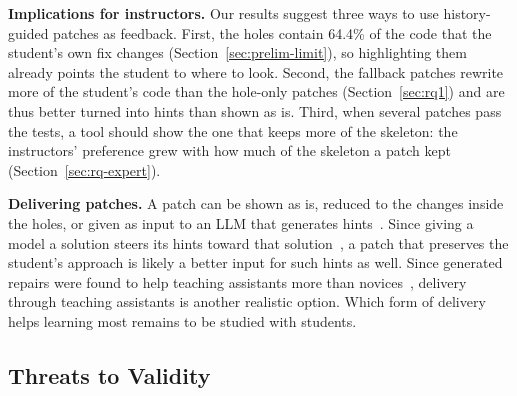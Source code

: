 \documentclass[10pt,conference]{IEEEtran}
\begin{document}
\textbf{Implications for instructors.} Our results suggest three ways to use history-guided patches as feedback. First, the holes contain 64.4\% of the code that the student's own fix changes (Section~\ref{sec:prelim-limit}), so highlighting them already points the student to where to look. Second, the fallback patches rewrite more of the student's code than the hole-only patches (Section~\ref{sec:rq1}) and are thus better turned into hints than shown as is. Third, when several patches pass the tests, a tool should show the one that keeps more of the skeleton: the instructors' preference grew with how much of the skeleton a patch kept (Section~\ref{sec:rq-expert}).

\textbf{Delivering patches.} A patch can be shown as is, reduced to the changes inside the holes, or given as input to an LLM that generates hints~\cite{phung2024automating}. Since giving a model a solution steers its hints toward that solution~\cite{roest2024next}, a patch that preserves the student's approach is likely a better input for such hints as well. Since generated repairs were found to help teaching assistants more than novices~\cite{yi2017feasibility}, delivery through teaching assistants is another realistic option. Which form of delivery helps learning most remains to be studied with students.

\subsection{Threats to Validity}\label{sec:threats}
\end{document}
